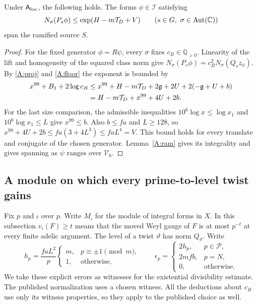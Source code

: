 \begin{chatAproposition}[Theorem A(a)]\label{A:short}
Under $\mathsf A_{\rm loc}$, the following holds.
The forms $\phi\in\mathcal I$ satisfying
\[
 N_\sigma(P_s\phi)\le\exp(H-m\mathcal T_D+V)\qquad(s\in G,\ \sigma\in\operatorname{Aut}(\mathbb C))
\]
span the ramified source $S$.
\end{chatAproposition}
\begin{proof}
For the fixed generator $\phi=R\psi$, every $\sigma$ fixes $c_B\in\mathbb Q_{>0}$. Linearity of the lift and homogeneity of the squared class norm give $N_\sigma(P_s\phi)=c_B^2 N_\sigma(Q_s z_\phi)$. By \eqref{A:proj} and \eqref{A:floor} the exponent is bounded by
\begin{align}
 x^{99}+B_1+2\log c_B
 &\le x^{99}+H-m\mathcal T_D+2\mathfrak g+2U+2(-\mathfrak g+U+b)\notag\\
 &=H-m\mathcal T_D+x^{99}+4U+2b.\label{A:normalize}
\end{align}
For the last size comparison, the admissible inequalities $10^6\log x\le\log x_1$ and $10^6\log x_1\le L$ give $x^{99}\le b$. Also $b\le fa$ and $L\ge128$, so $x^{99}+4U+2b\le fa(3+4L^3)\le faL^4=V$. This bound holds for every translate and conjugate of the chosen generator. Lemma~\ref{A:ram} gives its integrality and gives spanning as $\psi$ ranges over $\mathcal V_0$.
\end{proof}
\subsection{A module on which every prime-to-level twist gains}\label{A:local}
Fix $p$ and $\iota$ over $p$. Write $M_\iota$ for the module of integral forms in $X$. In this subsection $v_\iota(F)\ge t$ means that the moved Weyl gauge of $F$ is at most $p^{-t}$ at every finite adelic argument. The level of a twist $\vartheta$ has norm $Q_\vartheta$. Write
\[
 h_p=\frac{faL^2}{p}
 \begin{cases}m,&p\equiv\pm1\pmod m,\\1,&\text{otherwise},\end{cases}
 \qquad
 \epsilon_p=\begin{cases}2h_p,&p\in\mathcal P,\\2mfb,&p=N,\\0,&\text{otherwise}.\end{cases}
\]
We take these explicit errors as witnesses for the existential divisibility estimate. The published normalization uses a chosen witness. All the deductions about $c_B$ use only its witness properties, so they apply to the published choice as well.

